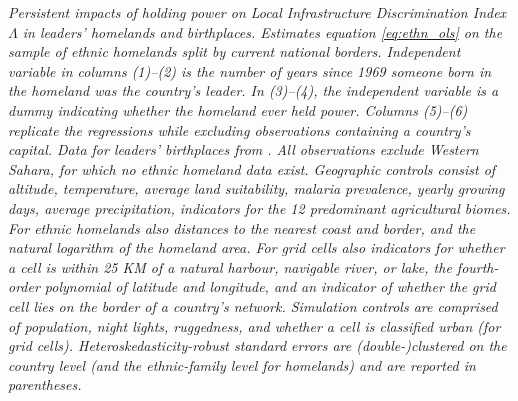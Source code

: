 \documentclass[11pt, oneside]{article}   	%
\newcommand{\mysubcaption}[1]{
\justify
\begin{spacing}{0.7}
\textit{\footnotesize #1}
\end{spacing}}
\begin{document}
\begin{table}[!ph]
\mysubcaption{Persistent impacts of holding power on Local Infrastructure Discrimination Index $\Lambda$ in leaders' homelands and birthplaces. Estimates equation \eqref{eq:ethn_ols} on the sample of ethnic homelands split by current national borders. Independent variable in columns (1)--(2) is the number of years since 1969 someone born in the homeland was the country's leader. In (3)--(4), the independent variable is a dummy indicating whether the homeland ever held power. Columns (5)--(6) replicate the regressions while excluding observations containing a country's capital. Data for leaders' birthplaces from \cite{Dreher_AiddemandAfrican_2016}. All observations exclude Western Sahara, for which no ethnic homeland data exist. Geographic controls consist of altitude, temperature, average land suitability, malaria prevalence, yearly growing days, average precipitation, indicators for the 12 predominant agricultural biomes. For ethnic homelands also distances to the nearest coast and border, and the natural logarithm of the homeland area. For grid cells also indicators for whether a cell is within 25 KM of a natural harbour, navigable river, or lake, the fourth-order polynomial of latitude and longitude, and an indicator of whether the grid cell lies on the border of a country's network. Simulation controls are comprised of population, night lights, ruggedness, and whether a cell is classified urban (for grid cells). Heteroskedasticity-robust standard errors are (double-)clustered on the country level (and the ethnic-family level for homelands) and are reported in parentheses.}
\end{table}
\end{document}
